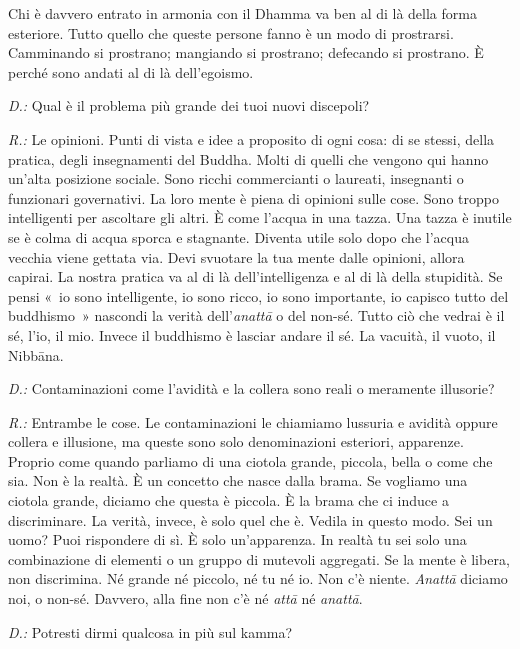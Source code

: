 Chi è davvero entrato in armonia con il Dhamma va ben al di là della
forma esteriore. Tutto quello che queste persone fanno è un modo di
prostrarsi. Camminando si prostrano; mangiando si prostrano; defecando
si prostrano. È perché sono andati al di là dell'egoismo.

\emph{D.:} Qual è il problema più grande dei tuoi nuovi discepoli?

\emph{R.:} Le opinioni. Punti di vista e idee a proposito di ogni cosa: di se
stessi, della pratica, degli insegnamenti del Buddha. Molti di quelli
che vengono qui hanno un'alta posizione sociale. Sono ricchi
commercianti o laureati, insegnanti o funzionari governativi. La loro
mente è piena di opinioni sulle cose. Sono troppo intelligenti per
ascoltare gli altri. È come l'acqua in una tazza. Una tazza è inutile se
è colma di acqua sporca e stagnante. Diventa utile solo dopo che l'acqua
vecchia viene gettata via. Devi svuotare la tua mente dalle opinioni,
allora capirai. La nostra pratica va al di là dell'intelligenza e al di
là della stupidità. Se pensi «~io sono intelligente, io sono ricco, io
sono importante, io capisco tutto del buddhismo~» nascondi la verità
dell'\emph{anattā} o del non-sé. Tutto ciò che vedrai è il sé, l'io, il
mio. Invece il buddhismo è lasciar andare il sé. La vacuità, il vuoto,
il Nibbāna.

\emph{D.:} Contaminazioni come l'avidità e la collera sono reali o meramente
illusorie?

\emph{R.:} Entrambe le cose. Le contaminazioni le chiamiamo lussuria e avidità
oppure collera e illusione, ma queste sono solo denominazioni esteriori,
apparenze. Proprio come quando parliamo di una ciotola grande, piccola,
bella o come che sia. Non è la realtà. È un concetto che nasce dalla
brama. Se vogliamo una ciotola grande, diciamo che questa è piccola. È
la brama che ci induce a discriminare. La verità, invece, è solo quel
che è. Vedila in questo modo. Sei un uomo? Puoi rispondere di sì. È solo
un'apparenza. In realtà tu sei solo una combinazione di elementi o un
gruppo di mutevoli aggregati. Se la mente è libera, non discrimina. Né
grande né piccolo, né tu né io. Non c'è niente. \emph{Anattā} diciamo
noi, o non-sé. Davvero, alla fine non c'è né \emph{attā} né
\emph{anattā}.

\emph{D.:} Potresti dirmi qualcosa in più sul kamma?

